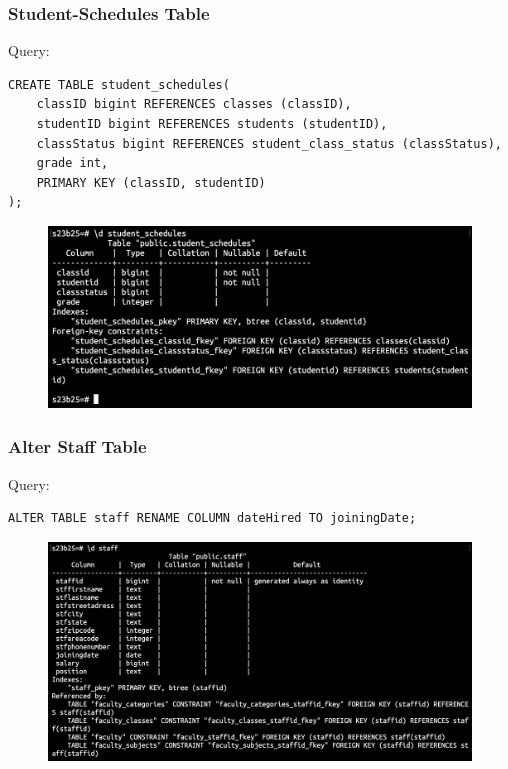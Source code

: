 \documentclass{article}
\begin{document}
\subsubsection*{Student-Schedules Table}
Query:
\begin{Verbatim}[frame=single,framerule=1pt,fontfamily=courier,fontsize=\small]
CREATE TABLE student_schedules(
    classID bigint REFERENCES classes (classID),
    studentID bigint REFERENCES students (studentID),
    classStatus bigint REFERENCES student_class_status (classStatus),
    grade int,
    PRIMARY KEY (classID, studentID)
);
\end{Verbatim}
\begin{figure}[h]
    \centering
    \includegraphics[width=\textwidth]{./o_13_student_schedules.png}
\end{figure}

\subsubsection*{Alter Staff Table}
Query:
\begin{Verbatim}[frame=single,framerule=1pt,fontfamily=courier,fontsize=\small]
ALTER TABLE staff RENAME COLUMN dateHired TO joiningDate;
\end{Verbatim}
\begin{figure}[h]
    \centering
    \includegraphics[width=\textwidth]{./o_14_alter_staff.png}
\end{figure}
\end{document}
